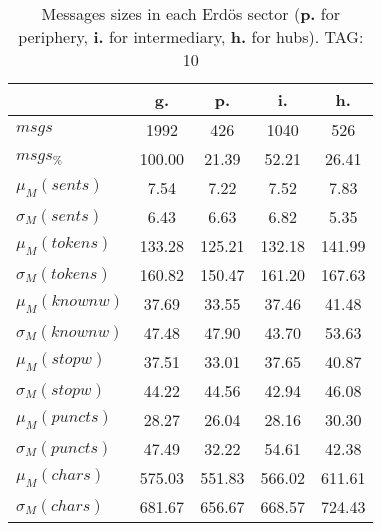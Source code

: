 \begin{table}[h!]
\begin{center}
\begin{tabular}{| l || c | c | c | c |}\hline
 & {\bf g.} & {\bf p.} & {\bf i.} & {\bf h.} \\\hline\hline
$msgs$ & 1992  & 426  & 1040  & 526 \\
$msgs_{\%}$ & 100.00  & 21.39  & 52.21  & 26.41 \\\hline
$\mu_M(sents)$ & 7.54  & 7.22  & 7.52  & 7.83 \\
$\sigma_M(sents)$ & 6.43  & 6.63  & 6.82  & 5.35 \\\hline
$\mu_M(tokens)$ & 133.28  & 125.21  & 132.18  & 141.99 \\
$\sigma_M(tokens)$ & 160.82  & 150.47  & 161.20  & 167.63 \\\hline
$\mu_M(knownw)$ & 37.69  & 33.55  & 37.46  & 41.48 \\
$\sigma_M(knownw)$ & 47.48  & 47.90  & 43.70  & 53.63 \\\hline
$\mu_M(stopw)$ & 37.51  & 33.01  & 37.65  & 40.87 \\
$\sigma_M(stopw)$ & 44.22  & 44.56  & 42.94  & 46.08 \\\hline
$\mu_M(puncts)$ & 28.27  & 26.04  & 28.16  & 30.30 \\
$\sigma_M(puncts)$ & 47.49  & 32.22  & 54.61  & 42.38 \\\hline
$\mu_M(chars)$ & 575.03  & 551.83  & 566.02  & 611.61 \\
$\sigma_M(chars)$ & 681.67  & 656.67  & 668.57  & 724.43 \\\hline
\end{tabular}
\caption{Messages sizes in each Erd\"os sector ({{\bf p.}} for periphery, {{\bf i.}} for intermediary, {{\bf h.}} for hubs). TAG: 10}
\end{center}
\end{table}